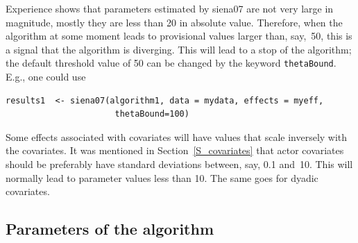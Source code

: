 \documentclass[a4paper,fleqn,11pt]{article}
\newcommand{\+}{\, + \,}
\newcommand{\sfn}[1]{\textsf{#1}}
\begin{document}
Experience shows that parameters estimated by \sfn{siena07} are
not very large in magnitude, mostly they are less than 20 in
absolute value. Therefore, when the algorithm at some moment leads to
provisional values larger than, say,~50, this is a signal that the
algorithm is diverging. This will lead to a stop of the algorithm;
the default threshold value of 50 can be changed by the keyword
\texttt{thetaBound}. E.g., one could use
\begin{verbatim}
results1  <- siena07(algorithm1, data = mydata, effects = myeff,
                      thetaBound=100)
\end{verbatim}
Some effects associated with covariates will have values that scale
inversely with the covariates.
It was mentioned in Section~\ref{S_covariates} that actor
covariates should be preferably have standard deviations between, say,
0.1 and~10. This will normally lead to parameter values less than 10.
The same goes for dyadic covariates.

\subsection{Parameters of the algorithm}
\label{S_param}
\end{document}
